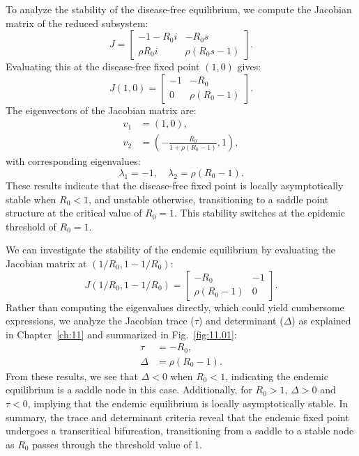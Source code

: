 To analyze the stability of the disease-free equilibrium, we compute the Jacobian matrix of the reduced subsystem:
\begin{equation*}
J =
\begin{bmatrix}
-1 -R_0 i & -R_0 s \\
\rho R_0 i & \rho(R_0 s - 1)
\end{bmatrix}.
\end{equation*}
Evaluating this at the disease-free fixed point $(1,0)$ gives:
\begin{equation*}
J(1,0) =
\begin{bmatrix}
-1 & -R_0 \\
0 & \rho(R_0 - 1)
\end{bmatrix}.
\end{equation*}
The eigenvectors of the Jacobian matrix are:
\begin{align*}
v_1 &= (1, 0), \\
v_2 &= \left(-\frac{R_0}{1+\rho(R_0 - 1)}, 1\right),
\end{align*}
with corresponding eigenvalues:
\begin{equation*}
\lambda_1 = -1, \quad \lambda_2 = \rho (R_0 - 1).
\end{equation*}
These results indicate that the disease-free fixed point is locally asymptotically stable when $R_0<1$, and unstable otherwise, transitioning to a saddle point structure at the critical value of $R_0=1$. This stability switches at the epidemic threshold of $R_0=1$.

We can investigate the stability of the endemic equilibrium by evaluating the Jacobian matrix at $(1/R_0, 1-1/R_0)$:
\begin{equation*}
J(1/R_0, 1-1/R_0) =
\begin{bmatrix}
-R_0 & -1 \\
\rho(R_0 -1) & 0
\end{bmatrix}.
\end{equation*}
Rather than computing the eigenvalues directly, which could yield cumbersome expressions, we analyze the Jacobian trace ($\tau$) and determinant ($\Delta$) as explained in Chapter~\ref{ch:11} and summarized in Fig.~\ref{fig:11.01}:
\begin{align*}
\tau &= -R_0, \\
\Delta &= \rho (R_0 -1).
\end{align*}
From these results, we see that $\Delta<0$ when $R_0<1$, indicating the endemic equilibrium is a saddle node in this case. Additionally, for $R_0>1$, $\Delta>0$ and $\tau<0$, implying that the endemic equilibrium is locally asymptotically stable. In summary, the trace and determinant criteria reveal that the endemic fixed point undergoes a transcritical bifurcation, transitioning from a saddle to a stable node as $R_0$ passes through the threshold value of 1.

